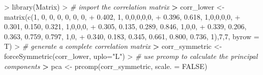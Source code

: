 \documentclass[
]{article}
\newenvironment{Shaded}{\begin{snugshade}}{\end{snugshade}}
\newcommand{\AttributeTok}[1]{\textcolor[rgb]{0.77,0.63,0.00}{#1}}
\newcommand{\CommentTok}[1]{\textcolor[rgb]{0.56,0.35,0.01}{\textit{#1}}}
\newcommand{\ConstantTok}[1]{\textcolor[rgb]{0.00,0.00,0.00}{#1}}
\newcommand{\DecValTok}[1]{\textcolor[rgb]{0.00,0.00,0.81}{#1}}
\newcommand{\ErrorTok}[1]{\textcolor[rgb]{0.64,0.00,0.00}{\textbf{#1}}}
\newcommand{\FloatTok}[1]{\textcolor[rgb]{0.00,0.00,0.81}{#1}}
\newcommand{\FunctionTok}[1]{\textcolor[rgb]{0.00,0.00,0.00}{#1}}
\newcommand{\NormalTok}[1]{#1}
\newcommand{\OtherTok}[1]{\textcolor[rgb]{0.56,0.35,0.01}{#1}}
\newcommand{\SpecialCharTok}[1]{\textcolor[rgb]{0.00,0.00,0.00}{#1}}
\newcommand{\StringTok}[1]{\textcolor[rgb]{0.31,0.60,0.02}{#1}}
\begin{document}
\begin{Shaded}
\begin{Highlighting}[]
\SpecialCharTok{\textgreater{}} \FunctionTok{library}\NormalTok{(Matrix)}
\SpecialCharTok{\textgreater{}} \CommentTok{\# import the correlation matrix}
\ErrorTok{\textgreater{}}\NormalTok{ corr\_lower }\OtherTok{\textless{}{-}} \FunctionTok{matrix}\NormalTok{(}\FunctionTok{c}\NormalTok{(}\DecValTok{1}\NormalTok{, }\DecValTok{0}\NormalTok{, }\DecValTok{0}\NormalTok{, }\DecValTok{0}\NormalTok{, }\DecValTok{0}\NormalTok{, }\DecValTok{0}\NormalTok{, }\DecValTok{0}\NormalTok{,}
\SpecialCharTok{+}                       \FloatTok{0.402}\NormalTok{, }\DecValTok{1}\NormalTok{, }\DecValTok{0}\NormalTok{,}\DecValTok{0}\NormalTok{,}\DecValTok{0}\NormalTok{,}\DecValTok{0}\NormalTok{,}\DecValTok{0}\NormalTok{,}
\SpecialCharTok{+}                       \FloatTok{0.396}\NormalTok{, }\FloatTok{0.618}\NormalTok{, }\DecValTok{1}\NormalTok{,}\DecValTok{0}\NormalTok{,}\DecValTok{0}\NormalTok{,}\DecValTok{0}\NormalTok{,}\DecValTok{0}\NormalTok{,}
\SpecialCharTok{+}                       \FloatTok{0.301}\NormalTok{, }\FloatTok{0.150}\NormalTok{, }\FloatTok{0.321}\NormalTok{, }\DecValTok{1}\NormalTok{,}\DecValTok{0}\NormalTok{,}\DecValTok{0}\NormalTok{,}\DecValTok{0}\NormalTok{,}
\SpecialCharTok{+}                       \FloatTok{0.305}\NormalTok{, }\FloatTok{0.135}\NormalTok{, }\FloatTok{0.289}\NormalTok{, }\FloatTok{0.846}\NormalTok{, }\DecValTok{1}\NormalTok{,}\DecValTok{0}\NormalTok{,}\DecValTok{0}\NormalTok{,}
\SpecialCharTok{+}                       \FloatTok{0.339}\NormalTok{, }\FloatTok{0.206}\NormalTok{, }\FloatTok{0.363}\NormalTok{, }\FloatTok{0.759}\NormalTok{, }\FloatTok{0.797}\NormalTok{, }\DecValTok{1}\NormalTok{,}\DecValTok{0}\NormalTok{,}
\SpecialCharTok{+}                       \FloatTok{0.340}\NormalTok{, }\FloatTok{0.183}\NormalTok{, }\FloatTok{0.345}\NormalTok{, }\FloatTok{0.661}\NormalTok{, }\FloatTok{0.800}\NormalTok{, }\FloatTok{0.736}\NormalTok{, }\DecValTok{1}\NormalTok{),}\DecValTok{7}\NormalTok{,}\DecValTok{7}\NormalTok{, }\AttributeTok{byrow =}\NormalTok{ T)}
\SpecialCharTok{\textgreater{}} \CommentTok{\# generate a complete correlation matrix}
\ErrorTok{\textgreater{}}\NormalTok{ corr\_symmetric }\OtherTok{\textless{}{-}} \FunctionTok{forceSymmetric}\NormalTok{(corr\_lower, }\AttributeTok{uplo=}\StringTok{"L"}\NormalTok{)}
\SpecialCharTok{\textgreater{}} \CommentTok{\# use prcomp to calculate the principal components}
\ErrorTok{\textgreater{}}\NormalTok{ pca }\OtherTok{\textless{}{-}} \FunctionTok{prcomp}\NormalTok{(corr\_symmetric, }\AttributeTok{scale. =} \ConstantTok{FALSE}\NormalTok{)}

\end{Highlighting}
\end{Shaded}
\end{document}
